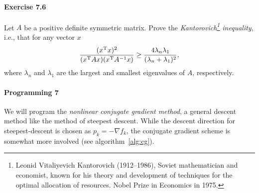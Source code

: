\paragraph{Exercise 7.6}
Let $A$ be a positive definite symmetric matrix. Prove the
\emph{Kantorovich\footnote{Leonid Vitaliyevich Kantorovich (1912--1986),
    Soviet mathematician and economist, known for his theory and development
    of techniques for the optimal allocation of resources. Nobel Prize in
    Economics in 1975.} inequality}, i.e., that for any vector $x$
\[
  \frac{(x^{\text{\upshape T}} x)^2}{(x^{\text{\upshape T}} A x)(x^{\text{\upshape T}} A^{-1}x)}
  \ge \frac{4\lambda_n\lambda_1}{(\lambda_n + \lambda_1)^2},
\]
where $\lambda_n$ and $\lambda_1$ are the largest and smallest eigenvalues of
$A$, respectively.

%
%

\paragraph{Programming 7}
We will program the \emph{nonlinear conjugate gradient method}, a general
descent method like the method of steepest descent. While the descent
direction for steepest-descent is chosen as $p_k=-\nabla f_k$, the
conjugate gradient scheme is somewhat more involved (see algorithm~\ref{alg:cg}).

